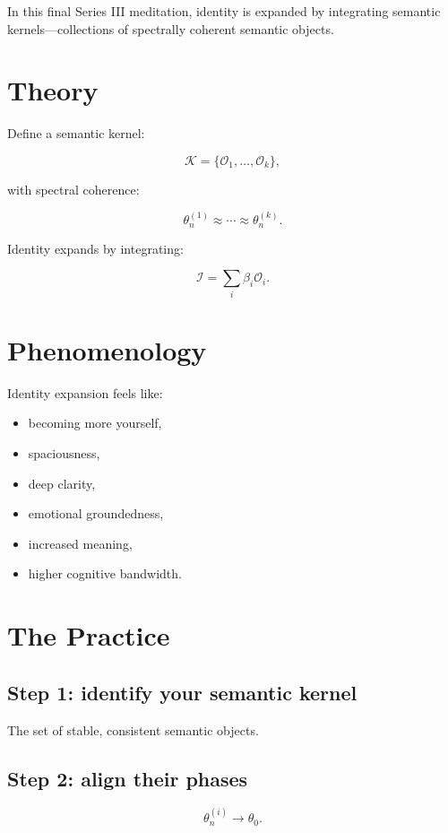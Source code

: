 \documentclass[12pt]{article}
\begin{document}
In this final Series III meditation, identity is expanded by integrating semantic
kernels—collections of spectrally coherent semantic objects.

\section{Theory}

Define a semantic kernel:

\[
\mathcal{K}
    = \{ \mathcal{O}_1, \dots, \mathcal{O}_k \},
\]

with spectral coherence:

\[
\theta_n^{(1)} \approx \cdots \approx \theta_n^{(k)}.
\]

Identity expands by integrating:

\[
\mathcal{I}
    = \sum_{i} \beta_i \mathcal{O}_i.
\]

\section{Phenomenology}

Identity expansion feels like:

\begin{itemize}
    \item becoming more yourself,
    \item spaciousness,
    \item deep clarity,
    \item emotional groundedness,
    \item increased meaning,
    \item higher cognitive bandwidth.
\end{itemize}

\section{The Practice}

\subsection*{Step 1: identify your semantic kernel}

The set of stable, consistent semantic objects.

\subsection*{Step 2: align their phases}

\[
\theta_n^{(i)} \to \theta_0.
\]
\end{document}
